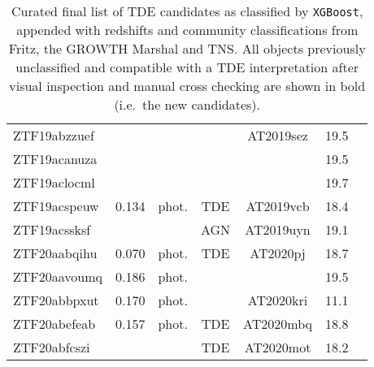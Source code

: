 \begin{table*}
\begin{tabular}{l  c  c  c   c  c  c}
    ZTF19abzzuef       & ~          & ~             & ~                       & AT2019sez         & 19.5                       &                \\
    ZTF19acanuza       & ~          & ~             & ~                       & ~                 & 19.5                       &                \\
    ZTF19aclocml       & ~          & ~             & ~                       & ~                 & 19.7                       &                \\
    ZTF19acspeuw       & 0.134      & phot.         & TDE                     & AT2019vcb         & 18.4                       &                \\
    ZTF19acssksf       & ~          & ~             & AGN                     & AT2019uyn         & 19.1                       &                \\
    ZTF20aabqihu       & 0.070      & phot.         & TDE                     & AT2020pj          & 18.7                       &                \\
    ZTF20aavoumq       & 0.186      & phot.         & ~                       & ~                 & 19.5                       &                \\
    ZTF20abbpxut       & 0.170      & phot.         & ~                       & AT2020kri         & 11.1                       &                \\
    ZTF20abefeab       & 0.157      & phot.         & TDE                     & AT2020mbq         & 18.8                       &                \\
    ZTF20abfcszi       & ~          & ~             & TDE                     & AT2020mot         & 18.2                       &                \\
  \end{tabular}
  \caption[Final TDE (candidates)]{Curated final list of TDE candidates as classified by \texttt{XGBoost}, appended with redshifts and community classifications from Fritz, the GROWTH Marshal and TNS. All objects previously unclassified and compatible with a TDE interpretation after visual inspection and manual cross checking are shown in bold (i.e.~the new candidates).}
  \label{tab:tde_candidates}
\end{table*}

